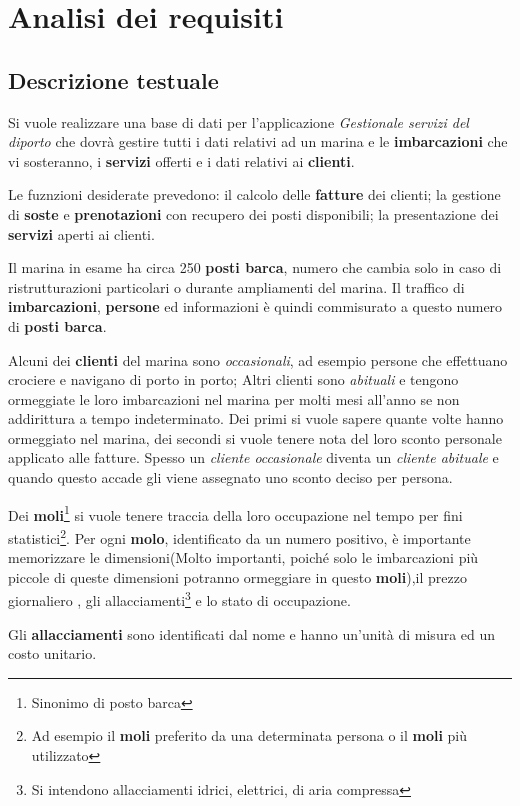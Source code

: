 
\section{Analisi dei requisiti}
\subsection{Descrizione testuale}
Si vuole realizzare una base di dati per l'applicazione \textit{Gestionale servizi del diporto} che dovrà gestire tutti i dati relativi ad un marina e le \textbf{imbarcazioni} che vi sosteranno, i \textbf{servizi} offerti e i dati relativi ai \textbf{clienti}.

Le fuznzioni desiderate prevedono: il calcolo delle \textbf{fatture} dei clienti; la gestione di \textbf{soste} e \textbf{prenotazioni} con recupero dei posti disponibili; la presentazione dei \textbf{servizi} aperti ai clienti.

Il marina in esame ha circa 250 \textbf{posti barca}, numero che cambia solo in caso di ristrutturazioni particolari o durante ampliamenti del marina. Il traffico di \textbf{imbarcazioni}, \textbf{persone} ed informazioni è quindi commisurato a questo numero di \textbf{posti barca}.

Alcuni dei \textbf{clienti} del marina sono \textit{occasionali}, ad esempio persone che effettuano crociere e navigano di porto in porto; Altri clienti sono \textit{abituali} e tengono ormeggiate le loro imbarcazioni nel marina per molti mesi all'anno se non addirittura a tempo indeterminato. Dei primi si vuole sapere quante volte hanno ormeggiato nel marina, dei secondi si vuole tenere nota del loro sconto personale applicato alle fatture. Spesso un \textit{cliente occasionale} diventa un \textit{cliente abituale} e quando questo accade gli viene assegnato uno sconto deciso per persona.

Dei \textbf{moli}\footnote{Sinonimo di posto barca} si vuole tenere traccia della loro occupazione nel tempo per fini statistici\footnote{Ad esempio il \textbf{moli} preferito da una determinata persona o il \textbf{moli} più utilizzato}. Per ogni \textbf{molo}, identificato da un numero positivo, è importante memorizzare le dimensioni(Molto importanti, poiché solo le imbarcazioni più piccole di queste dimensioni potranno ormeggiare in questo \textbf{moli}),il prezzo giornaliero , gli allacciamenti\footnote{Si intendono allacciamenti idrici, elettrici, di aria compressa} e lo stato di occupazione.

Gli \textbf{allacciamenti} sono identificati dal nome e hanno un'unità di misura ed un costo unitario.

